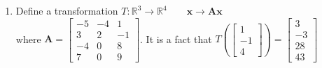 \documentclass[basic]{inVerba-notes}
\begin{document}
\begin{enumerate}[align=left, leftmargin=0pt, labelindent=\parindent, listparindent=\parindent, labelwidth=0pt, itemindent=!]
  \item {} Define a transformation 
  \(T: \mathbb{R}^3 \to \mathbb{R}^4 \qquad \bm{x} \to \bm{Ax}\) \\
  \medskip
  where \(\bm{A} = \begin{bmatrix}
  -5 & -4 & 1 \\
  3 & 2 & -1 \\
  -4 & 0 & 8 \\
  7 & 0 & 9
  \end{bmatrix}\). 
  It is a fact that 
  \(%
  T\left(\begin{bmatrix} 1 \\ -1 \\ 4 \end{bmatrix}\right) = \begin{bmatrix} 3 \\ -3 \\ 28 \\ 43 \end{bmatrix}
  \)%
  
  \medskip


\end{enumerate}
\end{document}

